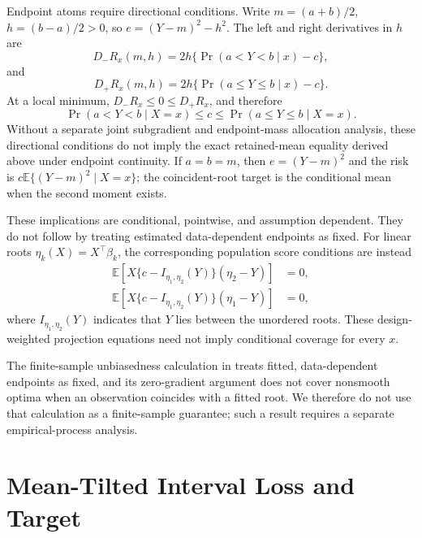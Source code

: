 \documentclass[11pt]{article}
\newcommand{\E}{\mathbb{E}}
\begin{document}
Endpoint atoms require directional conditions. Write
\(m=(a+b)/2\), \(h=(b-a)/2>0\), so
\(e=(Y-m)^2-h^2\). The left and right derivatives in \(h\) are
\[
D_-R_x(m,h)=2h\{\Pr(a<Y<b\mid x)-c\},
\]
and
\[
D_+R_x(m,h)=2h\{\Pr(a\le Y\le b\mid x)-c\}.
\]
At a local minimum, \(D_-R_x\le0\le D_+R_x\), and therefore
\[
\Pr(a<Y<b\mid X=x)\le c\le\Pr(a\le Y\le b\mid X=x).
\]
Without a separate joint subgradient and endpoint-mass allocation analysis,
these directional conditions do not imply the exact retained-mean equality
derived above under endpoint continuity.
If \(a=b=m\), then \(e=(Y-m)^2\) and the risk is
\(c\E\{(Y-m)^2\mid X=x\}\); the coincident-root target is the conditional
mean when the second moment exists.

These implications are conditional, pointwise, and assumption dependent. They
do not follow by treating estimated data-dependent endpoints as fixed. For
linear roots \(\eta_k(X)=X^\top\beta_k\), the corresponding population score
conditions are instead
\begin{align}
\E\left[X\{c-I_{\eta_1,\eta_2}(Y)\}(\eta_2-Y)\right]&=0,\\
\E\left[X\{c-I_{\eta_1,\eta_2}(Y)\}(\eta_1-Y)\right]&=0,
\end{align}
where \(I_{\eta_1,\eta_2}(Y)\) indicates that \(Y\) lies between the
unordered roots. These design-weighted projection equations need not imply
conditional coverage for every \(x\).

The finite-sample unbiasedness calculation in
\citet{PouplinEtAl2024RQR} treats fitted, data-dependent endpoints as fixed,
and its zero-gradient argument does not cover nonsmooth optima when an
observation coincides with a fitted root. We therefore do not use that
calculation as a finite-sample guarantee; such a result requires a separate
empirical-process analysis.

\section{Mean-Tilted Interval Loss and Target}
\label{sec:supp-mean-tilt}
\end{document}
